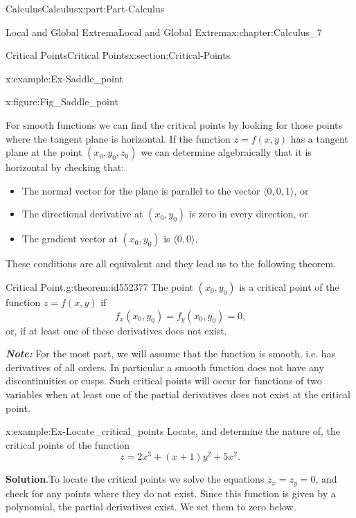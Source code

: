 \documentclass[oneside,10pt,]{book}
\newcommand{\blocktitlefont}{\relax}
\newcommand{\alert}[1]{\textbf{\textit{#1}}}
\numberwithin{equation}{section}
\begin{document}
\begin{partptx}{Calculus}{}{Calculus}{}{}{x:part:Part-Calculus}
\begin{chapterptx}{Local and Global Extrema}{}{Local and Global Extrema}{}{}{x:chapter:Calculus_7}
\begin{sectionptx}{Critical Points}{}{Critical Points}{}{}{x:section:Critical-Points}
\begin{example}{}{x:example:Ex-Saddle_point}
\begin{figureptx}{}{x:figure:Fig_Saddle_point}{}
\begin{image}{0.05}{0.9}{0.05}
\end{image}%
\tcblower
\end{figureptx}%
\end{example}
For smooth functions we can find the critical points by looking for those points where the tangent plane is horizontal. If the function \(z=f(x,y)\) has a tangent plane at the point \((x_0,y_0,z_0)\) we can determine algebraically that it is horizontal by checking that:%
\par
%
\begin{itemize}[label=\textbullet]
\item{}The normal vector for the plane is parallel to the vector \(\langle 0,0,1 \rangle\), or%
\item{}The directional derivative at \((x_0,y_0)\) is zero in every direction, or%
\item{}The gradient vector at \((x_0,y_0)\) is \(\langle 0,0 \rangle\).%
\end{itemize}
%
\par
These conditions are all equivalent and they lead us to the following theorem.%
\begin{theorem}{Critical Point.}{}{g:theorem:id552377}%
The point \((x_0,y_0)\) is a critical point of the function \(z = f(x,y)\) if%
\begin{equation*}
f_x(x_0,y_0) = f_y (x_0,y_0) = 0\text{,}
\end{equation*}
or, if at least one of these derivatives does not exist.%
\end{theorem}
\alert{Note:} For the most part, we will assume that the function is smooth, i.e. has derivatives of all orders.  In particular a smooth function does not have any discontinuities or cusps. Such critical points will occur for functions of two variables when at least one of the partial derivatives does not exist at the critical point.%
\begin{example}{}{x:example:Ex-Locate_critical_points}%
Locate, and determine the nature of, the critical points of the function%
\begin{equation*}
z = 2x^3 + (x+1)y^2 + 5x^2\text{.}
\end{equation*}
%
\par\smallskip%
\noindent\textbf{\blocktitlefont Solution}.\hypertarget{g:solution:id552390}{}\quad{}To locate the critical points we solve the equations \(z_x = z_y = 0\), and check for any points where they do not exist. Since this function is given by a polynomial, the partial derivatives exist.  We set them to zero below.%
\begin{align}

\end{align}
\end{example}
\end{sectionptx}
\end{chapterptx}
\end{partptx}
\end{document}
